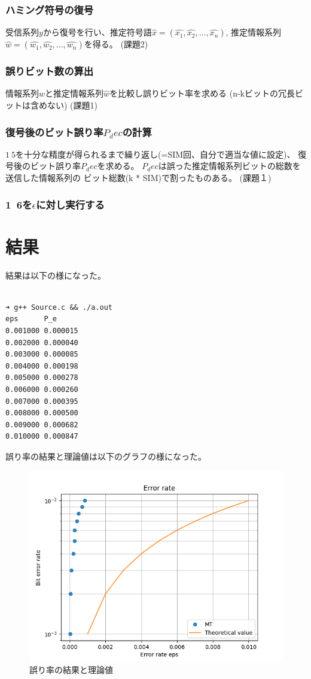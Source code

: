 \documentclass{jsarticle}
\begin{document}
\subsubsection{ハミング符号の復号}
受信系列$y$から復号を行い、推定符号語$\hat {x} = (\hat{x_1},\hat{x_2}, ..., \hat{x_n})$,
推定情報系列$\hat {w} = (\hat{w_1},\hat{w_2}, ..., \hat{w_n})$を得る。
(課題2)

\subsubsection{誤りビット数の算出}
情報系列$w$と推定情報系列$\hat{w}$を比較し誤りビット率を求める
(n-kビットの冗長ビットは含めない)
(課題1)

\subsubsection{復号後のビット誤り率$P_dec$の計算}
$1~5$を十分な精度が得られるまで繰り返し(=SIM回、自分で適当な値に設定)、
復号後のビット誤り率$P_dec$を求める。
$P_dec$は誤った推定情報系列ビットの総数を送信した情報系列の
ビット総数(k * SIM)で割ったものある。
(課題１)
\subsubsection{1~6を$\epsilon$に対し実行する}

\section{結果}
結果は以下の様になった。

\begin{lstlisting}

➜ g++ Source.c && ./a.out
eps      P_e
0.001000 0.000015
0.002000 0.000040
0.003000 0.000085
0.004000 0.000198
0.005000 0.000278
0.006000 0.000260
0.007000 0.000395
0.008000 0.000500
0.009000 0.000682
0.010000 0.000847

\end{lstlisting}


誤り率の結果と理論値は以下のグラフの様になった。
\begin{figure}[H]
  \centering
  \includegraphics[width=12cm]{./graph1.png}
  \caption{誤り率の結果と理論値}
\end{figure}
\end{document}
